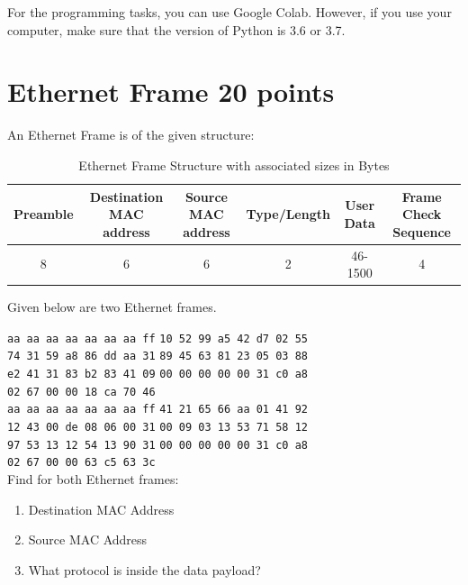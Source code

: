 \documentclass{resources/WeSTassignment}
\begin{document}
For the programming tasks, you can use Google Colab. However, if you use your computer, make sure that the version of Python is 3.6 or 3.7.

\section{Ethernet Frame \hfill{20 points}}
An Ethernet Frame is of the given structure:
\begin{table}[h]
    \centering
    \scriptsize
    \begin{tabular}{|c|c|c|c|c|c|}
    \hline
         Preamble & Destination MAC address & Source MAC address & Type/Length & User Data & Frame Check Sequence  \\ \hline
         8 & 6 & 6 & 2 & 46-1500 & 4 \\ \hline
    \end{tabular}
    \caption{Ethernet Frame Structure with associated sizes in Bytes}
    \label{tab:ethernet_frame_structure}
\end{table}

Given below are two Ethernet frames.

    \texttt{aa aa aa aa aa aa aa ff} \hspace{2cm} \texttt{10 52 99 a5 42 d7 02 55} \\
    \texttt{74 31 59 a8 86 dd aa 31} \hspace{2cm} \texttt{89 45 63 81 23 05 03 88} \\
    \texttt{e2 41 31 83 b2 83 41 09} \hspace{2cm} \texttt{00 00 00 00 00 31 c0 a8} \\
    \texttt{02 67 00 00 18 ca 70 46} \\
    

    \texttt{aa aa aa aa aa aa aa ff} \hspace{2cm} \texttt{41 21 65 66 aa 01 41 92} \\
    \texttt{12 43 00 de 08 06 00 31} \hspace{2cm} \texttt{00 09 03 13 53 71 58 12} \\
    \texttt{97 53 13 12 54 13 90 31} \hspace{2cm} \texttt{00 00 00 00 00 31 c0 a8} \\ 
    \texttt{02 67 00 00 63 c5 63 3c} \\
    
    Find for both Ethernet frames:
    \begin{enumerate}
        \item Destination MAC Address
        \item Source MAC Address
        \item What protocol is inside the data payload?
    \end{enumerate}
    
\end{document}
